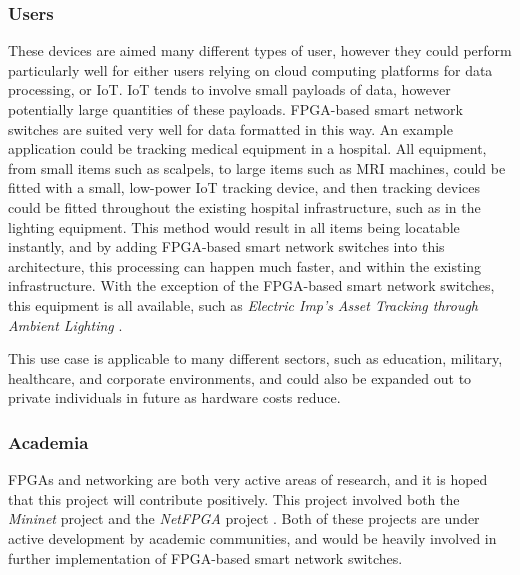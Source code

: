\subsubsection{Users}
These devices are aimed many different types of user, however they could perform particularly well for either users relying on cloud computing platforms for data processing, or IoT. IoT tends to involve small payloads of data, however potentially large quantities of these payloads. FPGA-based smart network switches are suited very well for data formatted in this way.
An example application could be tracking medical equipment in a hospital. All equipment, from small items such as scalpels, to large items such as MRI machines, could be fitted with a small, low-power IoT tracking device, and then tracking devices could be fitted throughout the existing hospital infrastructure, such as in the lighting equipment. This method would result in all items being locatable instantly, and by adding FPGA-based smart network switches into this architecture, this processing can happen much faster, and within the existing infrastructure.
With the exception of the FPGA-based smart network switches, this equipment is all available, such as \textit{Electric Imp's} \textit{Asset Tracking through Ambient Lighting} \cite{electric_imp} \cite{electric_imp_asset_tracking}.

This use case is applicable to many different sectors, such as education, military, healthcare, and corporate environments, and could also be expanded out to private individuals in future as hardware costs reduce.

\subsubsection{Academia}
FPGAs and networking are both very active areas of research, and it is hoped that this project will contribute positively. This project involved both the \textit{Mininet} project \cite{mininet} and the \textit{NetFPGA} project \cite{NetFPGA}. Both of these projects are under active development by academic communities, and would be heavily involved in further implementation of FPGA-based smart network switches. 
